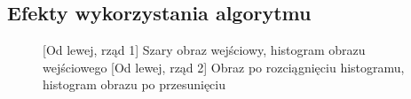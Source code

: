 \documentclass[a4paper,12pt, titlepage]{report}
\begin{document}
\subsection*{Efekty wykorzystania algorytmu}
\begin{figure}[h]
    \centering
    \qquad
    \caption{[Od lewej, rząd 1] Szary obraz wejściowy, histogram obrazu wejściowego [Od lewej, rząd 2] Obraz po rozciągnięciu histogramu, histogram obrazu po przesunięciu}%
    \label{fig:rysunek}%
\end{figure}
\end{document}

